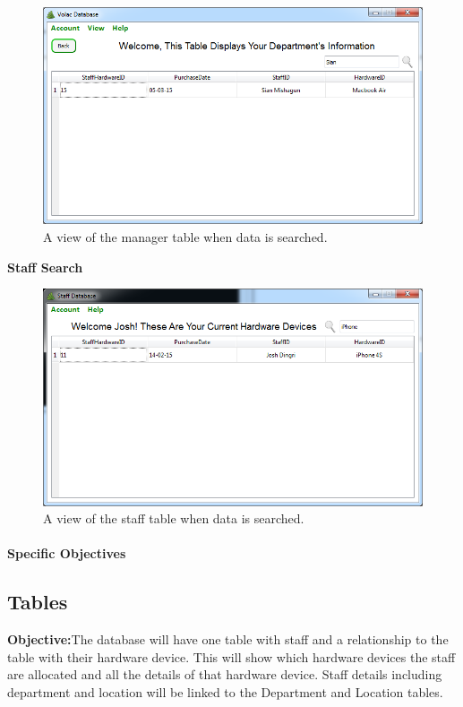 \begin{figure}[H]
    \includegraphics[width=\textwidth]{./Evaluation/Images/managersearch.png}
    \caption{A view of the manager table when data is searched.} 
\end{figure}

\textbf{Staff Search}

\begin{figure}[H]
    \includegraphics[width=\textwidth]{./Evaluation/Images/staffsearch.png}
    \caption{A view of the staff table when data is searched.} 
\end{figure}

\paragraph{Specific Objectives}

\subsection{Tables}

\textbf{Objective:}The database will have one table with staff and a relationship to the table with their hardware device. This will show which hardware devices the staff are allocated and all the details of that hardware device. Staff details including department and location will be linked to the Department and Location tables.

